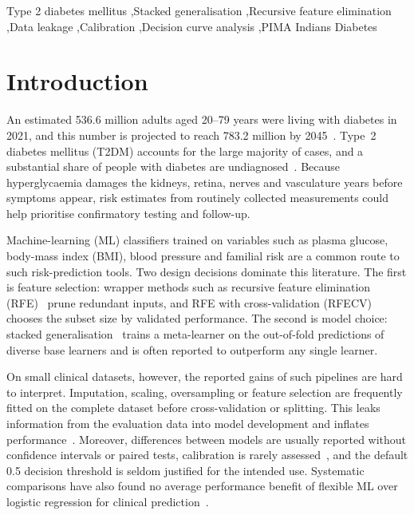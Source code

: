 \documentclass[preprint,12pt,authoryear=false]{elsarticle}
\begin{document}
\begin{frontmatter}
\begin{abstract}
\noindent\textbf{Conclusions:} Under leakage-free validation, ensemble complexity gave no discrimination gain over logistic regression in two cohorts, whereas calibration and threshold choice mattered more. These internal results do not establish clinical transportability.
\end{abstract}

\begin{keyword}
Type 2 diabetes mellitus \sep Stacked generalisation \sep Recursive feature elimination \sep Data leakage \sep Calibration \sep Decision curve analysis \sep PIMA Indians Diabetes
\end{keyword}

\end{frontmatter}

\section{Introduction}
\label{sec:intro}

An estimated 536.6 million adults aged 20--79 years were living with diabetes in 2021, and this number is projected to reach 783.2 million by 2045~\cite{sun2022idf}. Type~2 diabetes mellitus (T2DM) accounts for the large majority of cases, and a substantial share of people with diabetes are undiagnosed~\cite{idf2021}. Because hyperglycaemia damages the kidneys, retina, nerves and vasculature years before symptoms appear, risk estimates from routinely collected measurements could help prioritise confirmatory testing and follow-up.

Machine-learning (ML) classifiers trained on variables such as plasma glucose, body-mass index (BMI), blood pressure and familial risk are a common route to such risk-prediction tools. Two design decisions dominate this literature. The first is feature selection: wrapper methods such as recursive feature elimination (RFE)~\cite{guyon2002rfe,kohavi1997wrappers} prune redundant inputs, and RFE with cross-validation (RFECV) chooses the subset size by validated performance. The second is model choice: stacked generalisation~\cite{wolpert1992stacked} trains a meta-learner on the out-of-fold predictions of diverse base learners and is often reported to outperform any single learner.

On small clinical datasets, however, the reported gains of such pipelines are hard to interpret. Imputation, scaling, oversampling or feature selection are frequently fitted on the complete dataset before cross-validation or splitting. This leaks information from the evaluation data into model development and inflates performance~\cite{ambroise2002selection,kaufman2012leakage,kapoor2023leakage}. Moreover, differences between models are usually reported without confidence intervals or paired tests, calibration is rarely assessed~\cite{vancalster2019calibration}, and the default 0.5 decision threshold is seldom justified for the intended use. Systematic comparisons have also found no average performance benefit of flexible ML over logistic regression for clinical prediction~\cite{christodoulou2019}.
\end{document}
